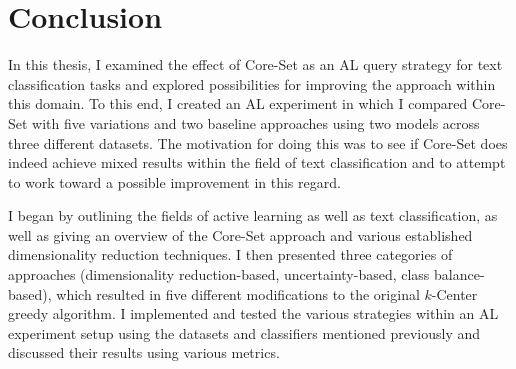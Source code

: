\documentclass[english,bachelor,ul]{webisthesis} %
\begin{document}
\chapter{Conclusion}

In this thesis, I examined the effect of Core-Set as an AL query strategy for text classification tasks and explored possibilities for improving the approach within this domain. To this end, I created an AL experiment in which I compared Core-Set with five variations and two baseline approaches using two models across three different datasets. The motivation for doing this was to see if Core-Set does indeed achieve mixed results within the field of text classification and to attempt to work toward a possible improvement in this regard. 

I began by outlining the fields of active learning as well as text classification, as well as giving an overview of the Core-Set approach and various established dimensionality reduction techniques. I then presented three categories of approaches (dimensionality reduction-based, uncertainty-based, class balance-based), which resulted in five different modifications to the original $k$-Center greedy algorithm. I implemented and tested the various strategies within an AL experiment setup using the datasets and classifiers mentioned previously and discussed their results using various metrics. 

\end{document}
